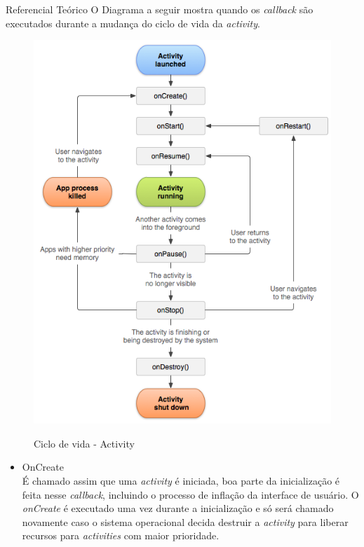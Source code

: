 \documentclass[
	12pt,				%
	openright,			%
	twoside,			%
	a4paper,			%
	english,			%
	french,				%
	spanish,			%
	brazil				%
	]{abntex2}
\begin{document}
\begin{chapter}{Referencial Teórico}
O Diagrama a seguir mostra quando os \textit{callback} são executados durante a mudança do ciclo de vida da \textit{activity}.
\begin{figure}[h]
\centering
   \caption{Ciclo de vida - Activity}
   \includegraphics[scale=0.70]{media/activity_lifecycle.png}
     \label{fig:lifecycle}
\end{figure}

\newpage
\begin{itemize}
\item{OnCreate} \\
     É chamado assim que uma \textit{activity} é iniciada, boa parte da inicialização é feita nesse \textit{callback}, incluindo o processo de inflação da interface de usuário. O \textit{onCreate} é executado uma vez durante a inicialização e só será chamado novamente caso o sistema operacional decida destruir a \textit{activity} para liberar recursos para \textit{activities} com maior prioridade.
     

\end{itemize}
\end{chapter}
\end{document}
